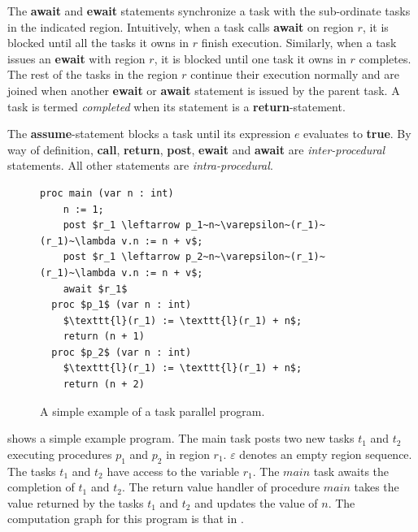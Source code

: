 The \textbf{await} and \textbf{ewait} statements synchronize a task with the sub-ordinate tasks in the indicated region. Intuitively, when a task calls \textbf{await} on region $r$, it is blocked until all the tasks it owns in $r$ finish execution. Similarly, when a task issues an \textbf{ewait} with region $r$, it is blocked until one task it owns in $r$ completes. The rest of the tasks in the region  $r$ continue their execution normally and are joined when another \textbf{ewait} or \textbf{await} statement is issued by the parent task. A task is termed \emph{completed} when its statement is a \textbf{return}-statement. 

The \textbf{assume}-statement blocks a task until its expression $e$ evaluates to \textbf{true}. By way of definition, \textbf{call}, \textbf{return}, \textbf{post}, \textbf{ewait} and \textbf{await} are \emph{inter-procedural} statements. All other statements are \emph{intra-procedural}.

\begin{figure}
  \begin{center}
    \begin{lstlisting}[mathescape=true]
  proc main (var n : int)
  	n := 1;
	post $r_1 \leftarrow p_1~n~\varepsilon~(r_1)~(r_1)~\lambda v.n := n + v$;
	post $r_1 \leftarrow p_2~n~\varepsilon~(r_1)~(r_1)~\lambda v.n := n + v$;
	await $r_1$
  proc $p_1$ (var n : int)
  	$\texttt{l}(r_1) := \texttt{l}(r_1) + n$;
	return (n + 1)
  proc $p_2$ (var n : int)
  	$\texttt{l}(r_1) := \texttt{l}(r_1) + n$;
	return (n + 2)
\end{lstlisting}
  \end{center}
  \caption{A simple example of a task parallel program.}
  \label{fig:hj-async-finish}
\end{figure}

 shows a simple example program. The main task posts two new tasks $t_1$ and $t_2$ executing procedures $p_1$ and $p_2$ in region $r_1$. $\varepsilon$ denotes an empty region sequence. The tasks $t_1$ and $t_2$ have access to the variable $r_1$. The $main$ task awaits the completion of $t_1$ and $t_2$. The return value handler of procedure $main$ takes the value returned by the tasks $t_1$ and $t_2$ and updates the value of $n$. The computation graph for this program is that in .

